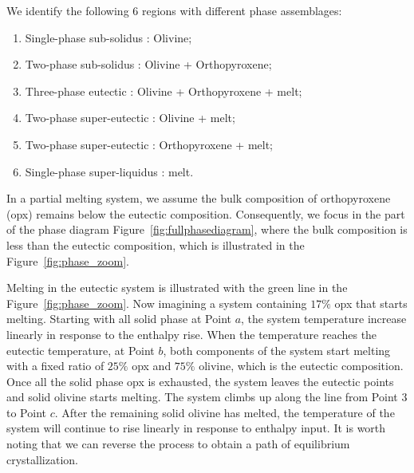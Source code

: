 We identify the following $6$ regions with different phase assemblages:
\begin{enumerate}[I]
\item Single-phase sub-solidus    \hspace{0.55cm}: Olivine;
\item Two-phase sub-solidus       \hspace{0.85cm}: Olivine + Orthopyroxene;
\item Three-phase eutectic        \hspace{1.15cm}: Olivine + Orthopyroxene + melt;
\item Two-phase super-eutectic    \hspace{0.3cm}: Olivine + melt;
\item Two-phase super-eutectic    \hspace{0.3cm}: Orthopyroxene + melt;
\item Single-phase super-liquidus : melt.
\end{enumerate}
In a partial melting system, 
we assume the bulk composition of orthopyroxene (opx) remains below the eutectic composition.
Consequently, we focus in the part of the phase diagram Figure~\ref{fig:fullphasediagram}, where the bulk composition is
less than the eutectic composition, which is illustrated in the Figure~\ref{fig:phase_zoom}.

Melting in the eutectic system is illustrated with the green line in the Figure~\ref{fig:phase_zoom}.
Now imagining a system containing $17\%$ opx that starts melting. Starting with all solid phase at
Point $a$, the 
system temperature increase linearly in response to the enthalpy rise. When the temperature reaches the 
eutectic temperature, at Point $b$, both components of the system start melting 
with a fixed ratio of $25\%$ opx and $75\%$ olivine, which is the eutectic composition.
Once all the solid phase opx is exhausted, the system leaves the eutectic points and solid olivine starts melting.
The system climbs up along the line from Point $3$
to Point $c$. After the remaining solid olivine has melted, the temperature of the system will continue to rise linearly
in response to enthalpy input. It is worth noting that we can reverse the process to obtain a path 
of equilibrium crystallization.

